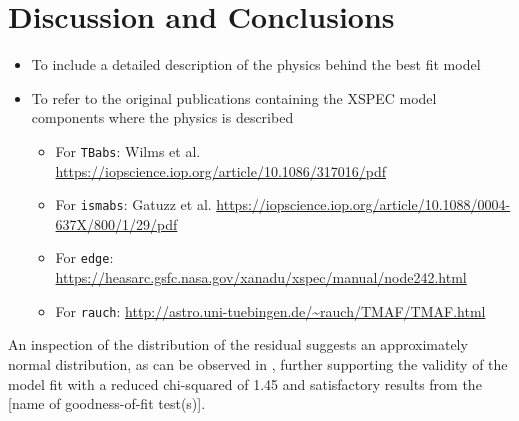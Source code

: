 \section{Discussion and Conclusions}
    \begin{itemize}
        \item To include a detailed description of the physics behind the best fit model
        \item To refer to the original publications containing the XSPEC model components where the physics is described
        \begin{itemize}
            \item For \texttt{TBabs}: Wilms et al. \url{https://iopscience.iop.org/article/10.1086/317016/pdf}
            \item For \texttt{ismabs}: Gatuzz et al. \url{https://iopscience.iop.org/article/10.1088/0004-637X/800/1/29/pdf}
            \item For \texttt{edge}: \url{https://heasarc.gsfc.nasa.gov/xanadu/xspec/manual/node242.html}
            \item For \texttt{rauch}: \url{http://astro.uni-tuebingen.de/~rauch/TMAF/TMAF.html}
        \end{itemize}
    \end{itemize}
    
    An inspection of the distribution of the residual suggests an approximately normal distribution, as can be observed in , further supporting the validity of the model fit with a reduced chi-squared of 1.45 and satisfactory results from the [name of goodness-of-fit test(s)].

